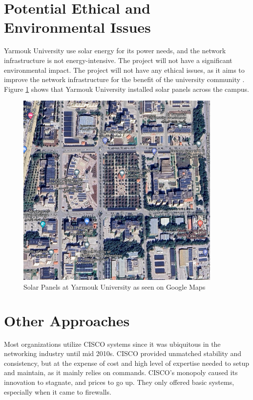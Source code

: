 \documentclass[12pt]{report}
\begin{document}
\section{Potential Ethical and Environmental Issues}
Yarmouk University use solar energy for its power needs, and the network infrastructure is not energy-intensive. The project will not have a significant environmental impact. The project will not have any ethical issues, as it aims to improve the network infrastructure for the benefit of the university community \cite{Solar}. Figure \ref{fig:YUMap} shows that Yarmouk University installed solar panels across the campus. 
\begin{figure}[h]
    \centering
    \includegraphics[width=0.9\textwidth]{images/Maps.png}
    \caption{Solar Panels at Yarmouk University as seen on Google Maps}
    \label{fig:YUMap}
\end{figure}
\newpage
\section{Other Approaches}
Most organizations utilize CISCO systems since it was ubiquitous in the networking industry until mid 2010s. CISCO provided unmatched stability and consistency, but at the expense of cost and high level of expertise needed to setup and maintain, as it mainly relies on commands. CISCO's monopoly caused its innovation to stagnate, and prices to go up. They only offered basic systems, especially when it came to firewalls.\cite{FNvsCISCO} \cite{CISCOInntoFin}
\end{document}
